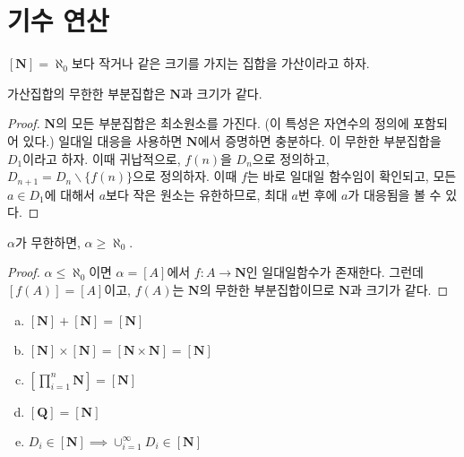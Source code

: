 \section{기수 연산}
\begin{definition}
	$[\mathbf{N}] = \aleph_0$보다 작거나 같은 크기를 가지는 집합을 가산이라고 하자.
\end{definition}
\begin{theorem}
	가산집합의 무한한 부분집합은 $\mathbf{N}$과 크기가 같다.
\end{theorem}
\begin{proof}
	$\mathbf{N}$의 모든 부분집합은 최소원소를 가진다.
	(이 특성은 자연수의 정의에 포함되어 있다.)
	일대일 대응을 사용하면 $\mathbf{N}$에서 증명하면 충분하다.
	이 무한한 부분집합을 $D_1$이라고 하자.
	이때 귀납적으로, $f(n)$을 $D_n$으로 정의하고, $D_{n+1} = D_n \backslash \{f(n)\}$으로 정의하자.
	이때 $f$는 바로 일대일 함수임이 확인되고, 모든 $a \in D_1$에 대해서 $a$보다 작은 원소는 유한하므로, 최대 $a$번 후에 $a$가 대응됨을 볼 수 있다.
\end{proof}
\begin{corollary}
\label{nsmallest}
	$\alpha$가 무한하면, $\alpha \geq \aleph_0$.
\end{corollary}
\begin{proof}
	$\alpha \leq \aleph_0$이면 $\alpha = [A]$에서 $f : A \to \mathbf{N}$인 일대일함수가 존재한다.
	그런데 $[f(A)] = [A]$이고, $f(A)$는 $\mathbf{N}$의 무한한 부분집합이므로 $\mathbf{N}$과 크기가 같다.
\end{proof}
\begin{theorem}
	\begin{enumerate}[(a)]
		\item $[\mathbf{N}] + [\mathbf{N}] = [\mathbf{N}]$
		\item $[\mathbf{N}] \times [\mathbf{N}] = [\mathbf{N} \times \mathbf{N}] = [\mathbf{N}]$
		\item $[\prod_{i=1}^{n} \mathbf{N}] = [\mathbf{N}]$
		\item $[\mathbf{Q}] = [\mathbf{N}]$
		\item $D_i \in [\mathbf{N}] \implies \cup_{i = 1}^{\infty} D_i \in [\mathbf{N}]$
	\end{enumerate}
\end{theorem}
